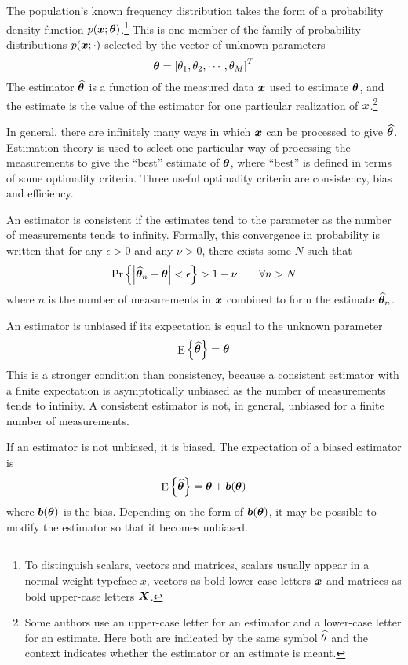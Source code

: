 The population's known frequency distribution takes the form of a
probability density function $p(\bm{x};\bm{\theta})$.\footnote{To distinguish scalars,
vectors and matrices, scalars usually appear in a normal-weight typeface
$x$, vectors as bold lower-case letters $\bm{x}$ and matrices as bold
upper-case letters $\bm{X}$.}  This is one member of the family of
probability distributions $p(\bm{x};\cdot)$ selected by the vector of unknown
parameters 
\begin{equation}
\bm{\theta}=\left[\theta_1, \theta_2, \cdots, \theta_M\right]^T
\end{equation} 
The estimator $\widehat{\bm{\theta}}$ is a function of the measured data $\bm{x}$ used to 
estimate $\bm{\theta}$, and the estimate is the value of the estimator for one
particular realization of $\bm{x}$.\footnote{Some authors use an upper-case
letter for an estimator and a lower-case letter for an estimate.
Here both are indicated by the same symbol $\widehat{\theta}$ and the context
indicates whether the estimator or an estimate is meant.}

In general, there are infinitely many ways in which $\bm{x}$ can be processed
to give $\widehat{\bm{\theta}}$.  Estimation theory is used to select one particular way of
processing the measurements to give the ``best'' estimate of $\bm{\theta}$, where
``best'' is defined in terms of some optimality criteria.  Three useful 
optimality criteria are consistency, bias and efficiency.

An estimator is consistent if the estimates tend to the parameter as
the number of measurements tends to infinity.  Formally, this convergence in
probability is written that for any $\epsilon>0$ and any $\nu>0$, there 
exists some $N$ such that
\begin{equation}
\Pr\left\{\left|\widehat{\bm{\theta}}_n-\bm{\theta}\right|<\epsilon\right\}>1-\nu \qquad\forall n>N
\end{equation}
where $n$ is the number of measurements in $\bm{x}$ combined to form the
estimate $\widehat{\bm{\theta}}_n$.  

An estimator is unbiased if its expectation is equal to the unknown
parameter
\begin{equation}
{\mathop{\rm E}\nolimits\left\{\widehat{\bm{\theta}}\right\}}=\bm{\theta}
\end{equation}
This is a stronger condition than consistency, because a consistent
estimator with a finite expectation is asymptotically unbiased as the number 
of measurements tends to infinity.  A consistent estimator is not, in
general, unbiased for a finite number of measurements.

If an estimator is not unbiased, it is biased.  The
expectation of a biased estimator is 
\begin{equation}
{\mathop{\rm E}\nolimits\left\{\widehat{\bm{\theta}}\right\}}=\bm{\theta}+\bm{b}(\bm{\theta})
\end{equation}
where $\bm{b}(\bm{\theta})$ is the bias.  Depending on the form of
$\bm{b}(\bm{\theta})$, it may be possible to modify the estimator
so that it becomes unbiased.

